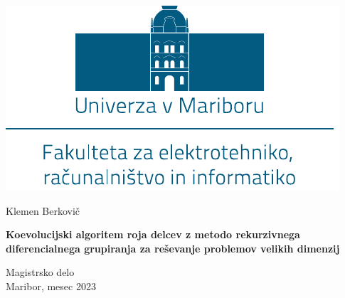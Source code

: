 \documentclass[openany, a4paper, 12pt]{book}
\newcommand{\aauthor}{Klemen Berkovi\v{c}}
\newcommand{\atitleslo}{Koevolucijski algoritem roja delcev z metodo rekurzivnega diferencialnega grupiranja za reševanje problemov velikih dimenzij}
\newcommand{\atype}{Magistrsko delo}
\newcommand{\adate}{Maribor, mesec 2023}
\begin{document}
\pagestyle{empty} %

\newpage
\begin{center}
\includegraphics[scale=0.9]{img/logo-um-feri.pdf} %
\vspace{3cm}

{\LARGE \aauthor\\} %
\vspace{10mm}

{\bf \huge \MakeUppercase \atitleslo}\\ %
\vspace{10mm}

{\LARGE \atype}\\ %
\vspace{8.5cm}
{\LARGE \adate}\\ %
\end{center}
\end{document}

